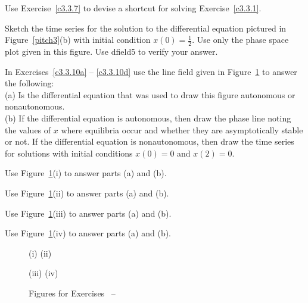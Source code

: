 \documentclass{ximera}
\begin{document}
\begin{exercise} \label{c3.3.9}
Use Exercise~\ref{c3.3.7} to devise a shortcut for solving
Exercise~\ref{c3.3.1}.
\end{exercise}

\begin{exercise} \label{c3.3.8}
Sketch the time series for the solution to the differential
equation pictured in Figure~\ref{pitch3}(b) with initial condition
$x(0)=\frac{1}{2}$.  Use only the phase space plot given in this
figure.  Use {\sf dfield5} to verify your answer.
\end{exercise}

\noindent In Exercises~\ref{c3.3.10a} -- \ref{c3.3.10d} use the line field 
given in Figure~\ref{F:exer3ad} to answer the following:\\
\noindent (a) Is the differential equation that was used to draw this figure 
autonomous or nonautonomous.\\
\noindent (b)  If the differential equation is autonomous, then draw the phase
line noting the values of $x$ where equilibria occur and whether they are 
asymptotically stable or not. If the differential equation is nonautonomous, 
then draw the time series for solutions with initial conditions $x(0)=0$ and 
$x(2)=0$.

\begin{exercise} \label{c3.3.10a}
Use Figure~\ref{F:exer3ad}(i) to answer parts (a) and (b).
\end{exercise}
\begin{exercise} \label{c3.3.10b}
Use Figure~\ref{F:exer3ad}(ii) to answer parts (a) and (b).
\end{exercise}
\begin{exercise} \label{c3.3.10c}
Use Figure~\ref{F:exer3ad}(iii) to answer parts (a) and (b).
\end{exercise}
\begin{exercise} \label{c3.3.10d}
Use Figure~\ref{F:exer3ad}(iv) to answer parts (a) and (b).
\end{exercise}

\begin{figure}[htb]
       \centerline{%
	}
\centerline{(i) \hspace{2.6in} (ii)}
       \centerline{%
	}
\centerline{(iii) \hspace{2.6in} (iv)}
       \caption{Figures for Exercises~\protect{\ref{c3.3.10a}} --
\protect{\ref{c3.3.10d}}}
       \label{F:exer3ad}
\end{figure}
\end{document}
